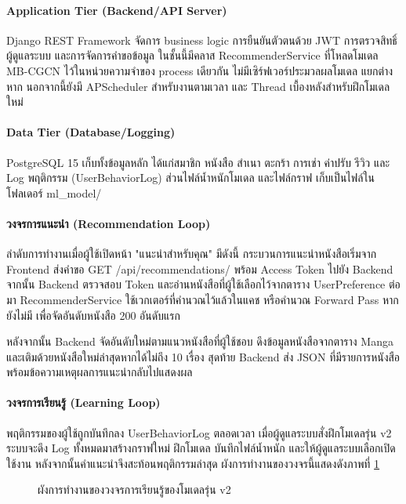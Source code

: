 \paragraph{Application Tier (Backend/API Server)}
Django REST Framework จัดการ business logic การยืนยันตัวตนด้วย JWT การตรวจสิทธิ์ผู้ดูแลระบบ และการจัดการคำขอข้อมูล ในชั้นนี้มีคลาส RecommenderService ที่โหลดโมเดล MB-CGCN ไว้ในหน่วยความจำของ process เดียวกัน ไม่มีเซิร์ฟเวอร์ประมวลผลโมเดล แยกต่างหาก นอกจากนี้ยังมี APScheduler สำหรับงานตามเวลา และ Thread เบื้องหลังสำหรับฝึกโมเดลใหม่

\paragraph{Data Tier (Database/Logging)}
PostgreSQL 15 เก็บทั้งข้อมูลหลัก ได้แก่สมาชิก หนังสือ สำเนา ตะกร้า การเช่า ค่าปรับ รีวิว และ Log พฤติกรรม (UserBehaviorLog) ส่วนไฟล์น้ำหนักโมเดล และไฟล์กราฟ เก็บเป็นไฟล์ในโฟลเดอร์ ml\_model/

\paragraph{วงจรการแนะนำ (Recommendation Loop)}
ลำดับการทำงานเมื่อผู้ใช้เปิดหน้า "แนะนำสำหรับคุณ" มีดังนี้
กระบวนการแนะนำหนังสือเริ่มจาก Frontend ส่งคำขอ GET /api/recommendations/ พร้อม Access Token ไปยัง Backend จากนั้น Backend ตรวจสอบ Token และอ่านหนังสือที่ผู้ใช้เลือกไว้จากตาราง UserPreference ต่อมา RecommenderService ใช้เวกเตอร์ที่คำนวณไว้แล้วในแคช หรือคำนวณ Forward Pass หากยังไม่มี เพื่อจัดอันดับหนังสือ 200 อันดับแรก

หลังจากนั้น Backend จัดอันดับใหม่ตามแนวหนังสือที่ผู้ใช้ชอบ ดึงข้อมูลหนังสือจากตาราง Manga และเติมด้วยหนังสือใหม่ล่าสุดหากได้ไม่ถึง 10 เรื่อง สุดท้าย Backend ส่ง JSON ที่มีรายการหนังสือพร้อมข้อความเหตุผลการแนะนำกลับไปแสดงผล

\paragraph{วงจรการเรียนรู้ (Learning Loop)}
พฤติกรรมของผู้ใช้ถูกบันทึกลง UserBehaviorLog ตลอดเวลา เมื่อผู้ดูแลระบบสั่งฝึกโมเดลรุ่น v2 ระบบจะดึง Log ทั้งหมดมาสร้างกราฟใหม่ ฝึกโมเดล บันทึกไฟล์น้ำหนัก และให้ผู้ดูแลระบบเลือกเปิดใช้งาน หลังจากนั้นคำแนะนำจึงสะท้อนพฤติกรรมล่าสุด ผังการทำงานของวงจรนี้แสดงดังภาพที่ \ref{fig:ch3_v2_data_pipeline}

\begin{figure}[H]
\centering
\caption{ผังการทำงานของวงจรการเรียนรู้ของโมเดลรุ่น v2}
\label{fig:ch3_v2_data_pipeline}
\end{figure}


